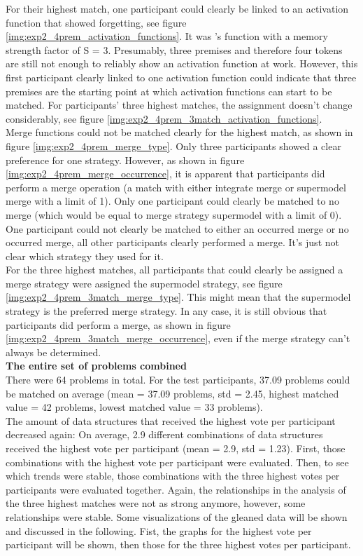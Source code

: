 \documentclass[hidelinks]{scrartcl}
\begin{document}
For their highest match, one participant could clearly be linked to an activation function that showed forgetting, see figure \ref{img:exp2_4prem_activation_functions}. It was \cite{Yffelti.2016}'s function with a memory strength factor of S = 3. Presumably, three premises and therefore four tokens are still not enough to reliably show an activation function at work. However, this first participant clearly linked to one activation function could indicate that three premises are the starting point at which activation functions can start to be matched. For participants' three highest matches, the assignment doesn't change considerably, see figure \ref{img:exp2_4prem_3match_activation_functions}. \\
Merge functions could not be matched clearly for the highest match, as shown in figure \ref{img:exp2_4prem_merge_type}. Only three participants showed a clear preference for one strategy. However, as shown in figure \ref{img:exp2_4prem_merge_occurrence}, it is apparent that participants did perform a merge operation (a match with either integrate merge or supermodel merge with a limit of 1). Only one participant could clearly be matched to no merge (which would be equal to merge strategy supermodel with a limit of 0). One participant could not clearly be matched to either an occurred merge or no occurred merge, all other participants clearly performed a merge. It's just not clear which strategy they used for it. \\
For the three highest matches, all participants that could clearly be assigned a merge strategy were assigned the supermodel strategy, see figure \ref{img:exp2_4prem_3match_merge_type}. This might mean that the supermodel strategy is the preferred merge strategy. In any case, it is still obvious that participants did perform a merge, as shown in figure \ref{img:exp2_4prem_3match_merge_occurrence}, even if the merge strategy can't always be determined. \\

\textbf{The entire set of problems combined} \\
There were 64 problems in total. For the test participants, 37.09 problems could be matched on average (mean = 37.09 problems, std = 2.45, highest matched value = 42 problems, lowest matched value = 33 problems). \\
The amount of data structures that received the highest vote per participant decreased again: On average, 2.9 different combinations of data structures received the highest vote per participant (mean = 2.9, std = 1.23). First, those combinations with the highest vote per participant were evaluated. Then, to see which trends were stable, those combinations with the three highest votes per participants were evaluated together. Again, the relationships in the analysis of the three highest matches were not as strong anymore, however, some relationships were stable. Some visualizations of the gleaned data will be shown and discussed in the following. Fist, the graphs for the highest vote per participant will be shown, then those for the three highest votes per participant. \\
\end{document}
